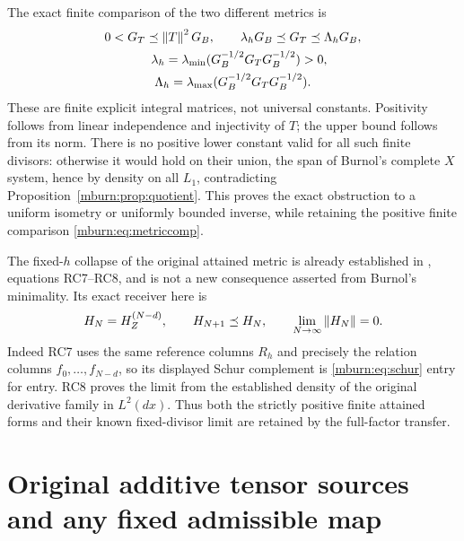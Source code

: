 \documentclass[11pt]{article}
\begin{document}
The exact finite comparison of the two different metrics is
\begin{equation}\label{mburn:eq:metriccomp}
 \begin{gathered}
 0<G_T\preceq\left\lVert T\right\rVert^2G_B,
 \qquad \lambda_hG_B\preceq G_T\preceq\Lambda_hG_B,\\
 \quad \lambda_h=\lambda_{\min}(G_B^{-1/2}G_TG_B^{-1/2})>0,
 \\
 \Lambda_h=\lambda_{\max}(G_B^{-1/2}G_TG_B^{-1/2}).
 \end{gathered}
\end{equation}
These are finite explicit integral matrices, not universal
constants. Positivity follows from linear independence and
injectivity of $T$; the upper bound follows from its norm.
There is no positive lower constant valid for all such finite
divisors: otherwise it would hold on their union, the span
of Burnol's complete $X$ system, hence by density on all
$L_1$, contradicting Proposition~\ref{mburn:prop:quotient}.
This proves the exact obstruction to a uniform isometry or
uniformly bounded inverse, while retaining the positive
finite comparison \eqref{mburn:eq:metriccomp}.

The fixed-$h$ collapse of the original attained metric is
already established in \cite{mburn:OriginalTheta}, equations
RC7--RC8, and is not a new consequence asserted from Burnol's
minimality. Its exact receiver here is
\[
 H_N=H_Z^{(N-d)},\qquad
 H_{N+1}\preceq H_N,\qquad
 \lim_{N\to\infty}\left\lVert H_N\right\rVert=0.
\]
Indeed RC7 uses the same reference columns $R_h$ and precisely
the relation columns $f_0,\ldots,f_{N-d}$, so its displayed
Schur complement is \eqref{mburn:eq:schur} entry for entry.
RC8 proves the limit from the established density of the
original derivative family in $L^2(dx)$. Thus both the
strictly positive finite attained forms and their known
fixed-divisor limit are retained by the full-factor transfer.

\section{Original additive tensor sources and any fixed admissible map}
\end{document}
